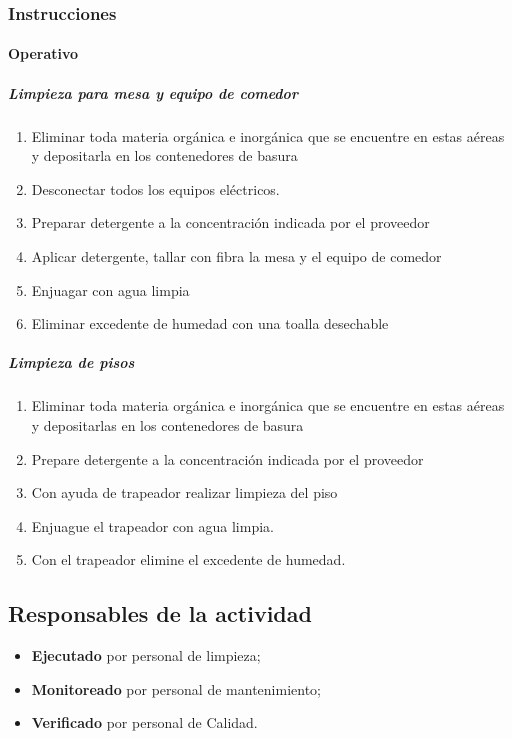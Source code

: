 \subsubsection{Instrucciones}
\paragraph{Operativo}
\subparagraph{Limpieza para mesa y equipo de comedor}
\begin{enumerate}
	\item Eliminar toda materia orgánica e inorgánica que se encuentre en estas aéreas y depositarla en los contenedores de basura
	\item Desconectar todos los equipos eléctricos.
	\item Preparar detergente a la concentración indicada por el proveedor
	\item Aplicar detergente, tallar con fibra la mesa y el equipo de comedor
	\item Enjuagar con agua limpia
	\item Eliminar excedente de humedad con una toalla desechable
\end{enumerate}

\subparagraph{Limpieza de pisos}
\begin{enumerate}
	\item Eliminar toda materia orgánica e inorgánica que se encuentre en estas aéreas y depositarlas en los contenedores de basura
	\item Prepare detergente a la concentración indicada por el proveedor
	\item Con ayuda de trapeador realizar limpieza del piso
	\item Enjuague el trapeador con agua limpia.
	\item Con el trapeador elimine el excedente de humedad.
\end{enumerate}

\subsection{Responsables de la actividad}

\begin{itemize}
	\item \textbf{Ejecutado} por personal de limpieza;
	\item \textbf{Monitoreado} por personal de mantenimiento;
	\item \textbf{Verificado} por personal de Calidad.
\end{itemize}

